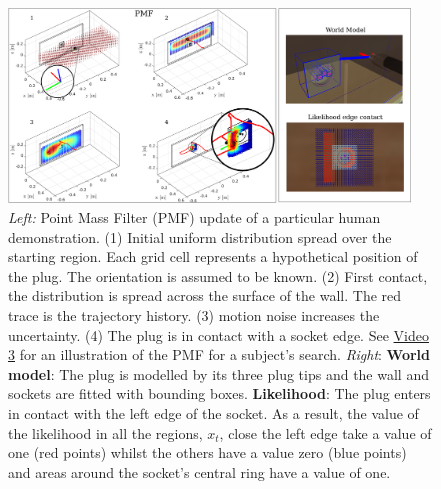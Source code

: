 \documentclass[final,5p,times,twocolumn]{elsarticle}
\begin{document}
\begin{figure}
 \centering
   \includegraphics[width=0.95\textwidth]{./Figure/Figure2.pdf}
   \caption{\textit{Left:} Point Mass Filter (PMF) update of a particular human demonstration. (1) Initial uniform distribution spread over the starting 
   region. Each grid cell represents a hypothetical position of the plug. The orientation is assumed to be known. (2) First contact, the distribution 
   is spread across the surface of the wall. The red trace is the trajectory history. (3) motion noise increases the uncertainty. (4) The plug is in contact with a socket edge.
   See \href{http://lasa.epfl.ch/videos/gpldecha/pih-search/subject_PMF_belief_location.wmv}{Video 3} for an illustration of the PMF for a subject's search.
   \textit{Right}: \textbf{World model}: The plug is modelled by its three plug tips and the wall and sockets are fitted with bounding boxes.
   \textbf{Likelihood}: The plug enters in contact with the left edge of the socket. As a result, the value of the likelihood in all the regions, $x_t$, close the left edge take 
   a value of one (red points)  whilst the others have a value zero (blue points) and areas around the socket's central 
   ring have a value of one. }
  \label{fig:PMF}
\end{figure}
\end{document}
